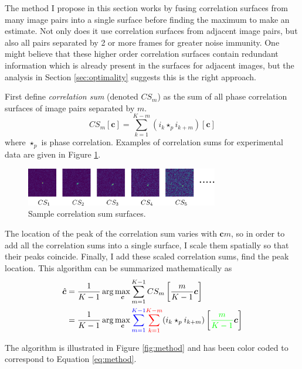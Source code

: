 \documentclass[tocnosub,noragright,centerchapter,12pt]{uiucecethesis09}
\begin{document}
The method I propose in this section works by fusing correlation surfaces from many image pairs into a single surface before finding the maximum to make an estimate.  Not only does it use correlation surfaces from adjacent image pairs, but also all pairs separated by 2 or more frames for greater noise immunity.  One might believe that these higher order correlation surfaces contain redundant information which is already present in the surfaces for adjacent images, but the analysis in Section \ref{sec:optimality} suggests this is the right approach.

First define \emph{correlation sum} (denoted $CS_m$) as the sum of all phase correlation surfaces of image pairs separated by $m$.
$$CS_m[\bm{c}] = \sum_{k=1}^{K - m} (i_k \star_p i_{k+m})[\bm{c}]$$
where $\star_p$ is phase correlation.
Examples of correlation sums for experimental data are given in Figure \ref{fig:correlations}.

\begin{figure}
  \centering
  \includegraphics[width=0.75\textwidth]{figures/correlations.png}
  \caption{Sample correlation sum surfaces.}
  \label{fig:correlations}
\end{figure}

The location of the peak of the correlation sum varies with $\bm{c}m$, so in order to add all the correlation sums into a single surface, I scale them spatially so that their peaks coincide.  Finally, I add these scaled correlation sums, find the peak location.  This algorithm can be summarized mathematically as
\begin{align}
  \hat{\bm{c}} &= \frac{1}{K - 1} \arg \max_{\bm{c}} \sum_{m=1}^{K - 1} CS_m \left[\frac{m}{K - 1} \bm{c}\right] \\
  &= \frac{1}{K - 1} \arg \max_{\bm{c}} {\color{blue}\sum_{m=1}^{K - 1}} {\color{red}\sum_{k=1}^{K - m}} (i_k \star_p i_{k + m})\left[ {\color{green}\frac{m}{K - 1}} \bm{c} \right]
  \label{eq:method}
\end{align}

The algorithm is illustrated in Figure \ref{fig:method} and has been color coded to correspond to Equation \ref{eq:method}.
\end{document}
